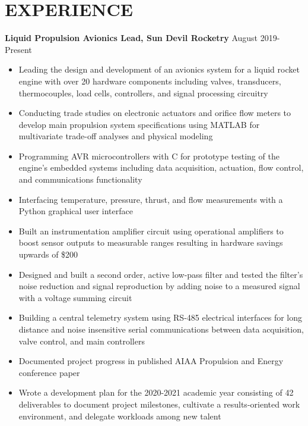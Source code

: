 \documentclass{article}
\begin{document}
\section{EXPERIENCE}
\textbf{Liquid Propulsion Avionics Lead, Sun Devil Rocketry}
\hfill
\vspace{0.5em}
August 2019-Present
\begin{itemize}
	\item{Leading the design and development of an avionics system for a liquid rocket engine with over 20 hardware components including valves, transducers, thermocouples, load cells, controllers, and signal processing circuitry}
	\item{Conducting trade studies on electronic actuators and orifice flow meters to develop main propulsion system specifications using MATLAB for multivariate trade-off analyses and physical modeling}
	\item{Programming AVR microcontrollers with C for prototype testing of the engine's embedded systems including data acquisition, actuation, flow control, and communications functionality}
	\item{Interfacing temperature, pressure, thrust, and flow measurements with a Python graphical user interface}
	\item{Built an instrumentation amplifier circuit using operational amplifiers to boost sensor outputs to measurable ranges resulting in hardware savings upwards of \$200}
	\item{Designed and built a second order, active low-pass filter and tested the filter's noise reduction and signal reproduction by adding noise to a measured signal with a voltage summing circuit}
	\item{Building a central telemetry system using RS-485 electrical interfaces for long distance and noise insensitive serial communications between data acquisition, valve control, and main controllers}
	\item{Documented project progress in published AIAA Propulsion and Energy conference paper}
	\item{Wrote a development plan for the 2020-2021 academic year consisting of 42 deliverables to document project milestones, cultivate a results-oriented work environment, and delegate workloads among new talent}	
\end{itemize}
\end{document}

